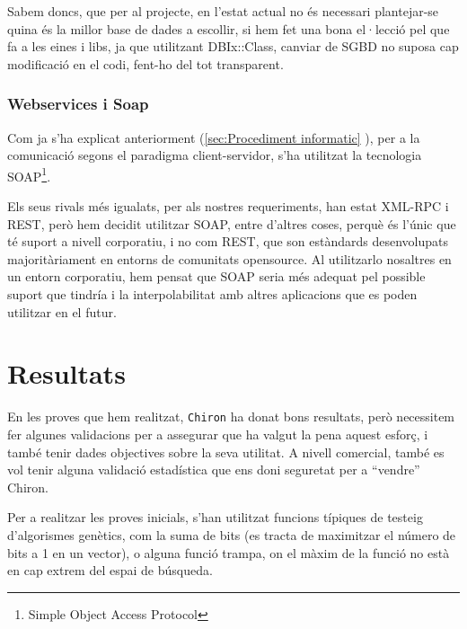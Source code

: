 Sabem doncs, que per al projecte, en l'estat actual no és necessari plantejar-se
quina és la millor base de dades a escollir, si hem fet una bona el·lecció pel
que fa a les eines i libs, ja que utilitzant DBIx::Class, canviar de SGBD no
suposa cap modificació en el codi, fent-ho del tot transparent.


\subsubsection{Webservices i Soap} %
\label{ssub:WS i Soap}

Com ja s'ha explicat anteriorment (\ref{sec:Procediment informatic} ), per a la
comunicació segons el paradigma client-servidor, s'ha utilitzat la tecnologia
SOAP\footnote{Simple Object Access Protocol}.

Els seus rivals més igualats, per als nostres requeriments, han estat XML-RPC i
REST, però hem decidit utilitzar SOAP, entre d'altres coses, perquè és l'únic
que té suport a nivell corporatiu, i no com REST, que son estàndards
desenvolupats majoritàriament en entorns de comunitats opensource.  Al
utilitzarlo nosaltres en un entorn corporatiu, hem pensat que SOAP seria més
adequat pel possible suport que tindría i la interpolabilitat amb altres
aplicacions que es poden utilitzar en el futur.


\section{Resultats} %
	\label{sec:Resultats}

	En les proves que hem realitzat, \texttt{Chiron} ha donat bons resultats,
	però necessitem fer algunes validacions per a assegurar que ha valgut la
	pena aquest esforç, i també tenir dades objectives sobre la seva utilitat.
	A nivell comercial, també es vol tenir alguna validació estadística que ens
	doni seguretat per a ``vendre'' Chiron.

	Per a realitzar les proves inicials, s'han utilitzat funcions típiques de
	testeig d'algorismes genètics, com la suma de bits (es tracta de maximitzar
	el número de bits a 1 en un vector), o alguna funció trampa, on el màxim de
	la funció no està en cap extrem del espai de búsqueda.

